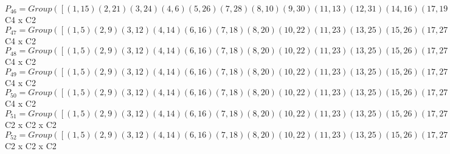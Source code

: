 \documentclass[varwidth=\maxdimen,border=10]{standalone}
\begin{document}
\begin{tabular}
$P_{46} = Group( [ ( 1,15)( 2,21)( 3,24)( 4, 6)( 5,26)( 7,28)( 8,10)( 9,30)(11,13)(12,31)(14,16)(17,19)(18,32)(20,22)(23,25)(27,29), ( 1,18,16,19)( 2,25,22, 3)( 4,27,26,28)( 5, 7, 6,29)( 8,31,30,11)( 9,13,10,12)(14,17,15,32)(20,24,21,23), ( 1,16)( 2,22)( 3,25)( 4,26)( 5, 6)( 7,29)( 8,30)( 9,10)(11,31)(12,13)(14,15)(17,32)(18,19)(20,21)(23,24)(27,28) ] )\cong$ C4 x C2\ \\
$P_{47} = Group( [ ( 1, 5)( 2, 9)( 3,12)( 4,14)( 6,16)( 7,18)( 8,20)(10,22)(11,23)(13,25)(15,26)(17,27)(19,29)(21,30)(24,31)(28,32), ( 1, 6)( 2,10)( 3,13)( 4,15)( 5,16)( 7,19)( 8,21)( 9,22)(11,24)(12,25)(14,26)(17,28)(18,29)(20,30)(23,31)(27,32), ( 1,27,16,28)( 2,31,22,11)( 3, 8,25,30)( 4,18,26,19)( 5,17, 6,32)( 7,15,29,14)( 9,24,10,23)(12,20,13,21) ] )\cong$ C4 x C2\ \\
$P_{48} = Group( [ ( 1, 5)( 2, 9)( 3,12)( 4,14)( 6,16)( 7,18)( 8,20)(10,22)(11,23)(13,25)(15,26)(17,27)(19,29)(21,30)(24,31)(28,32), ( 1, 6)( 2,10)( 3,13)( 4,15)( 5,16)( 7,19)( 8,21)( 9,22)(11,24)(12,25)(14,26)(17,28)(18,29)(20,30)(23,31)(27,32), ( 1,18,16,19)( 2,25,22, 3)( 4,27,26,28)( 5, 7, 6,29)( 8,31,30,11)( 9,13,10,12)(14,17,15,32)(20,24,21,23) ] )\cong$ C4 x C2\ \\
$P_{49} = Group( [ ( 1, 5)( 2, 9)( 3,12)( 4,14)( 6,16)( 7,18)( 8,20)(10,22)(11,23)(13,25)(15,26)(17,27)(19,29)(21,30)(24,31)(28,32), ( 1, 6)( 2,10)( 3,13)( 4,15)( 5,16)( 7,19)( 8,21)( 9,22)(11,24)(12,25)(14,26)(17,28)(18,29)(20,30)(23,31)(27,32), ( 1, 8, 6,21)( 2,15,10, 4)( 3,27,13,32)( 5,20,16,30)( 7,31,19,23)( 9,26,22,14)(11,18,24,29)(12,17,25,28) ] )\cong$ C4 x C2\ \\
$P_{50} = Group( [ ( 1, 5)( 2, 9)( 3,12)( 4,14)( 6,16)( 7,18)( 8,20)(10,22)(11,23)(13,25)(15,26)(17,27)(19,29)(21,30)(24,31)(28,32), ( 1, 6)( 2,10)( 3,13)( 4,15)( 5,16)( 7,19)( 8,21)( 9,22)(11,24)(12,25)(14,26)(17,28)(18,29)(20,30)(23,31)(27,32), ( 1, 2, 6,10)( 3,18,13,29)( 4, 8,15,21)( 5, 9,16,22)( 7,25,19,12)(11,27,24,32)(14,20,26,30)(17,31,28,23) ] )\cong$ C4 x C2\ \\
$P_{51} = Group( [ ( 1, 5)( 2, 9)( 3,12)( 4,14)( 6,16)( 7,18)( 8,20)(10,22)(11,23)(13,25)(15,26)(17,27)(19,29)(21,30)(24,31)(28,32), ( 1, 6)( 2,10)( 3,13)( 4,15)( 5,16)( 7,19)( 8,21)( 9,22)(11,24)(12,25)(14,26)(17,28)(18,29)(20,30)(23,31)(27,32), ( 1, 3)( 2, 7)( 4,11)( 5,12)( 6,13)( 8,17)( 9,18)(10,19)(14,23)(15,24)(16,25)(20,27)(21,28)(22,29)(26,31)(30,32) ] )\cong$ C2 x C2 x C2\ \\
$P_{52} = Group( [ ( 1, 5)( 2, 9)( 3,12)( 4,14)( 6,16)( 7,18)( 8,20)(10,22)(11,23)(13,25)(15,26)(17,27)(19,29)(21,30)(24,31)(28,32), ( 1, 6)( 2,10)( 3,13)( 4,15)( 5,16)( 7,19)( 8,21)( 9,22)(11,24)(12,25)(14,26)(17,28)(18,29)(20,30)(23,31)(27,32), ( 1,11)( 2,17)( 3, 4)( 5,23)( 6,24)( 7, 8)( 9,27)(10,28)(12,14)(13,15)(16,31)(18,20)(19,21)(22,32)(25,26)(29,30) ] )\cong$ C2 x C2 x C2\ \\

\end{tabular}
\end{document}
